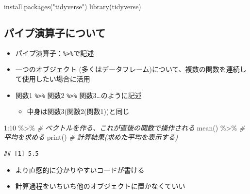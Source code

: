\documentclass[
]{ltjsarticle}
\newenvironment{Shaded}{\begin{snugshade}}{\end{snugshade}}
\newcommand{\CommentTok}[1]{\textcolor[rgb]{0.56,0.35,0.01}{\textit{#1}}}
\newcommand{\DecValTok}[1]{\textcolor[rgb]{0.00,0.00,0.81}{#1}}
\newcommand{\FunctionTok}[1]{\textcolor[rgb]{0.00,0.00,0.00}{#1}}
\newcommand{\NormalTok}[1]{#1}
\newcommand{\SpecialCharTok}[1]{\textcolor[rgb]{0.00,0.00,0.00}{#1}}
\newcommand{\StringTok}[1]{\textcolor[rgb]{0.31,0.60,0.02}{#1}}
\providecommand{\tightlist}{%
  \setlength{\itemsep}{0pt}\setlength{\parskip}{0pt}}
\begin{document}
\begin{Shaded}
\begin{Highlighting}[]
\FunctionTok{install.packages}\NormalTok{(}\StringTok{"tidyverse"}\NormalTok{)}
\FunctionTok{library}\NormalTok{(tidyverse)}
\end{Highlighting}
\end{Shaded}

\hypertarget{ux30d1ux30a4ux30d7ux6f14ux7b97ux5b50ux306bux3064ux3044ux3066}{%
\subsection{パイプ演算子について}\label{ux30d1ux30a4ux30d7ux6f14ux7b97ux5b50ux306bux3064ux3044ux3066}}

\begin{itemize}
\tightlist
\item
  パイプ演算子：\texttt{\%\textgreater{}\%}で記述
\item
  一つのオブジェクト
  (多くはデータフレーム)について、複数の関数を連続して使用したい場合に活用
\item
  関数1 \texttt{\%\textgreater{}\%} 関数2 \texttt{\%\textgreater{}\%}
  関数3\ldots のように記述

  \begin{itemize}
  \tightlist
  \item
    中身は関数3(関数2(関数1))と同じ
  \end{itemize}
\end{itemize}

\begin{Shaded}
\begin{Highlighting}[]
\DecValTok{1}\SpecialCharTok{:}\DecValTok{10} \SpecialCharTok{\%\textgreater{}\%} \CommentTok{\# ベクトルを作る、これが直後の関数で操作される}
  \FunctionTok{mean}\NormalTok{() }\SpecialCharTok{\%\textgreater{}\%} \CommentTok{\# 平均を求める}
  \FunctionTok{print}\NormalTok{() }\CommentTok{\# 計算結果(求めた平均を表示する)}
\end{Highlighting}
\end{Shaded}

\begin{verbatim}
## [1] 5.5
\end{verbatim}

\begin{itemize}
\tightlist
\item
  より直感的に分かりやすいコードが書ける
\item
  計算過程をいちいち他のオブジェクトに置かなくていい
\end{itemize}
\end{document}

